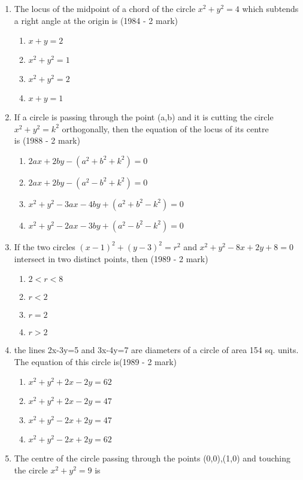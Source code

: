 \documentclass[journal,12pt,twocolumn]{IEEEtran}
\theoremstyle{remark}
\begin{document}
\begin{enumerate}
\begin{enumerate}[label=(\alph*)]
    \end{enumerate}
    \item The locus of the midpoint of a chord of the circle $x^{2}+y^{2}=4$ which subtends a right angle at the origin is \hfill {(1984 - 2 mark)}
    \begin{enumerate}[label=(\alph*)]
    \item $x+y=2$
    \item $x^{2}+y^{2}=1$
    \item $x^{2}+y^{2}=2$
    \item $x+y=1$
    \end{enumerate}
    \item If a circle is passing through the point (a,b) and it is cutting the circle $x^{2}+y^{2}=k^{2}$ orthogonally, then the equation of the locus of its centre \\ is 
    \hfill {(1988 - 2 mark)}
    \begin{enumerate}[label=(\alph*)]
    \item $2ax + 2by - (a^{2}+b^{2}+k^{2}) = 0$
    \item $2ax + 2by - (a^{2}-b^{2}+k^{2}) = 0$
    \item $x^{2} + y^{2}-3ax-4by+ (a^{2}+b^{2}-k^{2}) = 0$
    \item $x^{2} + y^{2}-2ax-3by+ (a^{2}-b^{2}-k^{2}) = 0$
    \end{enumerate}
    \item If the two circles $(x-1)^{2} + (y-3)^{2} = r^{2}$ and $x^{2}+y^{2}-8x+2y+8=0$ intersect in two distinct points, then \hfill {(1989 - 2 mark)} 
    \begin{enumerate}[label=(\alph*)]
    \item $2<r<8$
    \item $r<2$
    \item $r=2$
    \item $r>2$
    \end{enumerate}
    \item the lines 2x-3y=5 and 3x-4y=7 are diameters of a circle of area 154 sq. units. The equation of this circle is\hfill {(1989 - 2 mark)}
    \begin{enumerate}[label=(\alph*)]
    \item $x^{2}+y^{2}+2x-2y=62$
    \item $x^{2}+y^{2}+2x-2y=47$
    \item $x^{2}+y^{2}-2x+2y=47$
    \item $x^{2}+y^{2}-2x+2y=62$
    \end{enumerate}
    \item The centre of the circle passing through the points (0,0),(1,0) and touching the circle $x^{2}+y^{2}=9$ is

\end{enumerate}
\end{document}
